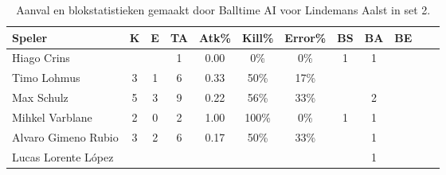 \begin{table}[ht!]
  \centering
  \scriptsize
  \begin{tabular}{|l|c|c|c|c|c|c|c|c|c|c|c|} \hline
    \textbf{Speler} & K & E & TA & Atk\% & Kill\%  & Error\% & BS & BA & BE \\ \hline
    Hiago Crins & & & 1 & 0.00 & 0\%  & 0\% & 1 & 1 &\\
    Timo Lohmus & 3 & 1 & 6 & 0.33 & 50\%  & 17\% &  &  & \\
    Max Schulz & 5 & 3 & 9 & 0.22 & 56\%  & 33\% &  & 2 &  \\
    Mihkel Varblane & 2 & 0 & 2 & 1.00 & 100\%  & 0\% & 1 & 1 &  \\
    Alvaro Gimeno Rubio & 3 & 2 & 6 & 0.17 & 50\%  & 33\% &  & 1 & \\
    Lucas Lorente López &  &  &  &  &  &  &  & 1 & \\ \hline
  \end{tabular}
  \caption[Aanvals- en blokstatistieken gemaakt door Balltime AI voor Lindemans Aalst in set 2]{\label{tab:PL1AttBlockAalstAI2}Aanval en blokstatistieken gemaakt door Balltime AI voor Lindemans Aalst in set 2.}
\end{table}

